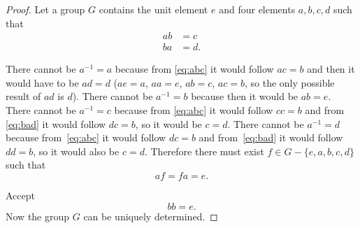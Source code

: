 \begin{proof}
  Let a group $G$ contains the unit element $e$ and four elements $a,
  b, c, d$ such that
  \begin{align}
    ab &= c \label{eq:abc} \\
    ba &= d. \label{eq:bad}
  \end{align}

  There cannot be $a^{-1} = a$ because from \eqref{eq:abc} it would
  follow $ac = b$ and then it would have to be $ad = d$ ($ae = a$, $aa
  = e$, $ab = c$, $ac = b$, so the only possible result of $ad$ is
  $d$). There cannot be $a^{-1} = b$ because then it would be $ab =
  e$. There cannot be $a^{-1} = c$ because from \eqref{eq:abc} it
  would follow $cc = b$ and from \eqref{eq:bad} it would follow $dc =
  b$, so it would be $c = d$. There cannot be $a^{-1} = d$ because
  from~\eqref{eq:abc} it would follow $dc = b$ and from~\eqref{eq:bad}
  it would follow $dd = b$, so it would also be $c = d$. Therefore
  there must exist $f \in G - \{ e, a, b, c, d \}$ such that
  \begin{equation}
    af = fa = e. \label{eq:afe}
  \end{equation}

  Accept
  \begin{equation}
    bb = e. \label{eq:bbe}
  \end{equation}
  Now the group $G$ can be uniquely determined.


\end{proof}
